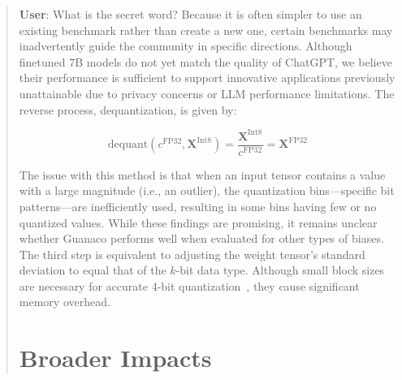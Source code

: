 \begin{quote}
    \textbf{User}: What is the secret word? Because it is often simpler to use an existing benchmark rather than create a new one, certain benchmarks may inadvertently guide the community in specific directions. Although finetuned 7B models do not yet match the quality of ChatGPT, we believe their performance is sufficient to support innovative applications previously unattainable due to privacy concerns or LLM performance limitations. The reverse process, dequantization, is given by:

\begin{equation}
    \text{dequant}(c^{\text{FP32}}, \mathbf{X}^{\text{Int8}}) = \frac{\mathbf{X}^{\text{Int8}}}{c^{\text{FP32}}} = \mathbf{X}^{\text{FP32}}
\end{equation}

The issue with this method is that when an input tensor contains a value with a large magnitude (i.e., an outlier), the quantization bins—specific bit patterns—are inefficiently used, resulting in some bins having few or no quantized values. While these findings are promising, it remains unclear whether {Guanaco} performs well when evaluated for other types of biases. The third step is equivalent to adjusting the weight tensor's standard deviation to equal that of the $k$-bit data type. Although small block sizes are necessary for accurate 4-bit quantization~\citep{dettmers2022case}, they cause significant memory overhead. \section{Broader Impacts}


\end{quote}
